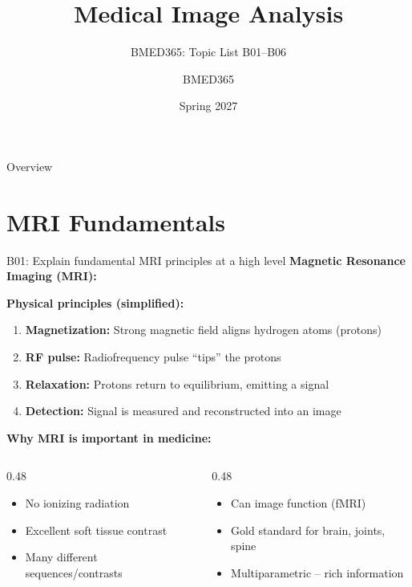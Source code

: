 \documentclass[aspectratio=169, 10pt]{beamer}
\title{Medical Image Analysis}
\subtitle{BMED365: Topic List B01--B06}
\author{BMED365}
\date{Spring 2027}
\begin{document}
\begin{frame}
    \titlepage
\end{frame}

\begin{frame}{Overview}
    \tableofcontents
\end{frame}

\section{MRI Fundamentals}

\begin{frame}{B01: Explain fundamental MRI principles at a high level}
    \textbf{Magnetic Resonance Imaging (MRI):}
    
    \vspace{0.3cm}
    \textbf{Physical principles (simplified):}
    \begin{enumerate}
        \item \textbf{Magnetization:} Strong magnetic field aligns hydrogen atoms (protons)
        \item \textbf{RF pulse:} Radiofrequency pulse ``tips'' the protons
        \item \textbf{Relaxation:} Protons return to equilibrium, emitting a signal
        \item \textbf{Detection:} Signal is measured and reconstructed into an image
    \end{enumerate}
    
    \vspace{0.3cm}
    \textbf{Why MRI is important in medicine:}
    \begin{columns}[T]
        \begin{column}{0.48\textwidth}
            \begin{itemize}
                \item No ionizing radiation
                \item Excellent soft tissue contrast
                \item Many different sequences/contrasts
            \end{itemize}
        \end{column}
        \begin{column}{0.48\textwidth}
            \begin{itemize}
                \item Can image function (fMRI)
                \item Gold standard for brain, joints, spine
                \item Multiparametric -- rich information
            \end{itemize}
        \end{column}
    \end{columns}
    

\end{frame}
\end{document}
